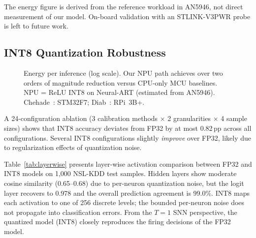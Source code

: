 \documentclass[conference]{IEEEtran}
\begin{document}
The energy figure is derived from the reference workload in AN5946,
not direct measurement of our model. On-board validation with an
STLINK-V3PWR probe is left to future work.

\subsection{INT8 Quantization Robustness}
\label{sec:quant}

\begin{figure}[t]
\centering
{}
\caption{Energy per inference (log scale). Our NPU path achieves
over two orders of magnitude reduction versus CPU-only MCU baselines.
NPU = ReLU INT8 on Neural-ART (estimated from AN5946).
Chehade~\cite{chehade2025stm32}: STM32F7;
Diab~\cite{diab2025rpi}: RPi~3B+.}
\label{fig:energy}
\end{figure}

A 24-configuration ablation (3 calibration methods $\times$
2 granularities $\times$ 4 sample sizes) shows that INT8 accuracy
deviates from FP32 by at most 0.82\,pp across all configurations.
Several INT8 configurations slightly \emph{improve} over FP32,
likely due to regularization effects of quantization noise.

Table~\ref{tab:layerwise} presents layer-wise activation comparison
between FP32 and INT8 models on 1,000 NSL-KDD test samples.
Hidden layers show moderate cosine similarity (0.65--0.68) due to
per-neuron quantization noise, but the logit layer recovers to 0.978
and the overall prediction agreement is 99.0\%.
INT8 maps each activation to one of 256 discrete levels; the bounded
per-neuron noise does not propagate into classification errors.
From the $T{=}1$ SNN perspective, the quantized model (INT8) closely
reproduces the firing decisions of the FP32 model.
\end{document}
